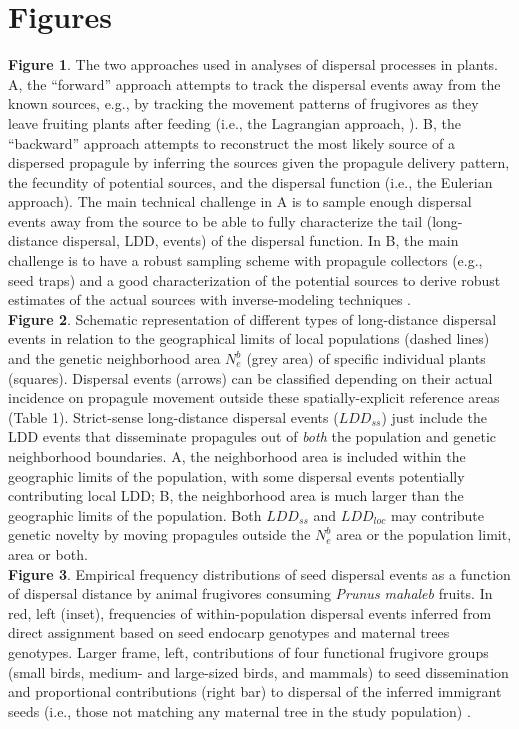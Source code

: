 \documentclass[a4paper, 12pt]{article}
\begin{document}
\section*{Figures}
\begin{linenumbers}

\textbf{Figure 1}. The two approaches used in analyses of dispersal processes in plants. A, the “forward” approach attempts to track the dispersal events away from the known sources, e.g., by tracking the movement patterns of frugivores as they leave fruiting plants after feeding (i.e., the Lagrangian approach, \citep{Nathan:2003qe}). B, the “backward” approach  attempts to reconstruct the most likely source of a dispersed propagule by inferring the sources given the propagule delivery pattern, the fecundity of potential sources, and the dispersal function (i.e., the Eulerian approach). The main technical challenge in A is to sample enough dispersal events away from the source to be able to fully characterize the tail (long-distance dispersal, LDD, events) of the dispersal function. In B, the main challenge is to have a robust sampling scheme with propagule collectors (e.g., seed traps) and a good characterization of the potential sources to derive robust estimates of the actual sources with inverse-modeling techniques \citep{Nathan:2003qe}.\\
 
\textbf{Figure 2}. Schematic representation of different types of long-distance dispersal events in relation to the geographical limits of local populations (dashed lines) and the genetic neighborhood area $N^b_e$ (grey area) of specific individual plants (squares). Dispersal events (arrows) can be classified depending on their actual incidence on propagule movement outside these spatially-explicit reference areas (Table 1). Strict-sense long-distance dispersal events ($LDD_{ss}$) just include the LDD events that disseminate propagules out of \textit{both} the population and genetic neighborhood boundaries. A, the neighborhood area is included within the geographic limits of the population, with some dispersal events potentially contributing local LDD; B, the neighborhood area is much larger than the geographic limits of the population. Both $LDD_{ss}$ and $LDD_{loc}$ may contribute genetic novelty by moving propagules outside the $N^b_e$ area or the population limit, area or both.\\
 
\textbf{Figure 3}. Empirical frequency distributions of seed dispersal events as a function of dispersal distance by animal frugivores consuming \textit{Prunus mahaleb} fruits. In red, left (inset), frequencies of within-population dispersal events inferred from direct assignment based on seed endocarp genotypes and maternal trees genotypes. Larger frame, left, contributions of four functional frugivore groups (small birds, medium- and large-sized birds, and mammals) to seed dissemination and proportional contributions (right bar) to dispersal of the inferred immigrant seeds (i.e., those not matching any maternal tree in the study population) \citep{Jordano:2007}.\\
 

\end{linenumbers}
\end{document}
